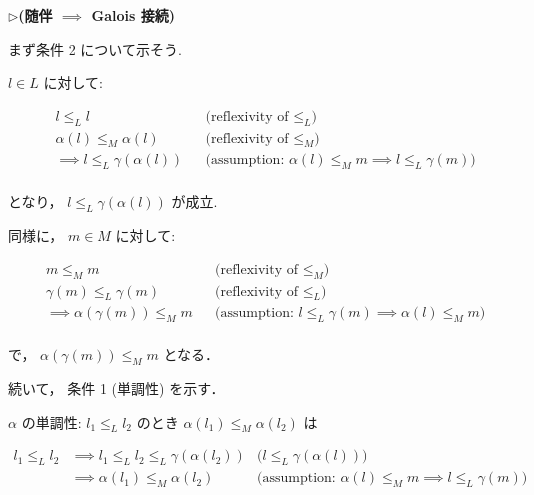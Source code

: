 \documentclass[uplatex]{jsarticle}
\newenvironment{proofpart}[1]
  {\par\vspace{1em}\noindent\hspace{10pt}$\triangleright$\hspace{5pt}\textbf{#1}\\[0.3em]
   \hspace{10pt}\begin{tcolorbox}[enhanced,
     left=20pt, right=0pt, top=3pt, bottom=3pt,
     colback=white,
     colframe=white,
     leftrule=0.3pt,
     rightrule=0pt,
     toprule=0pt,
     bottomrule=0pt,
     sharp corners,
     boxsep=0pt,
     before skip=0pt,
     after skip=1em
   ]}
  {\end{tcolorbox}}
\begin{document}
\begin{proofpart}{(随伴 $\implies$ Galois 接続)}

  まず条件 2 について示そう.

  $l \in L$ に対して:

  \begin{align*}
     & l \leq_L l
     &                                     & \text{(reflexivity of $\leq_L$)}                                      \\
     & \alpha(l) \leq_M \alpha(l)
     &                                     & \text{(reflexivity of $\leq_M$)}                                      \\
     & \implies l \leq_L \gamma(\alpha(l))
     &                                     & \text{(assumption: $\alpha(l) \leq_M m \implies l \leq_L \gamma(m)$)} \\
  \end{align*}

  となり， $l \leq_L \gamma(\alpha(l))$ が成立.

  同様に， $m \in M$ に対して:

  \begin{align*}
     & m \leq_M m
     &                                     & \text{(reflexivity of $\leq_M$)}                                      \\
     & \gamma(m) \leq_L \gamma(m)
     &                                     & \text{(reflexivity of $\leq_L$)}                                      \\
     & \implies \alpha(\gamma(m)) \leq_M m
     &                                     & \text{(assumption: $l \leq_L \gamma(m) \implies \alpha(l) \leq_M m$)} \\
  \end{align*}

  で， $\alpha(\gamma(m)) \leq_M m$ となる．

  続いて， 条件 1 (単調性) を示す．


  $\alpha$ の単調性: $l_1 \leq_L l_2$ のとき $\alpha(l_1) \leq_M \alpha(l_2)$ は

  \begin{align*}
    l_1 \leq_L l_2
     & \implies l_1 \leq_L l_2 \leq_L \gamma(\alpha(l_2))
     & \text{($l \leq_L \gamma(\alpha(l))$)}                                 \\
     & \implies \alpha(l_1) \leq_M \alpha(l_2)
     & \text{(assumption: $\alpha(l) \leq_M m \implies l \leq_L \gamma(m)$)} \\
  \end{align*}


\end{proofpart}
\end{document}
